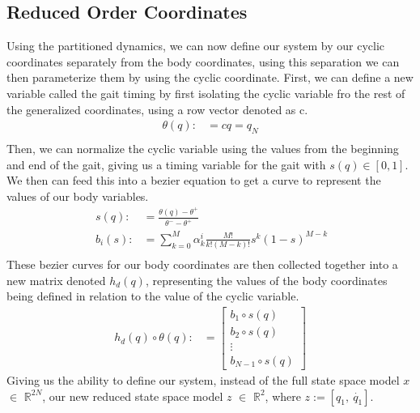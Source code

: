 \documentclass[letterpaper, 10 pt, conference]{ieeeconf}  %
\begin{document}
\subsection{Reduced Order Coordinates}
Using the partitioned dynamics, we can now define our system by our cyclic coordinates separately from the body coordinates, using this separation we can then parameterize them by using the cyclic coordinate. First, we can define a new variable called the gait timing by first isolating the cyclic variable fro the rest of the generalized coordinates, using a row vector denoted as c. 
\begin{equation}
\begin{aligned}
    \theta(q) :&= cq = q_N \\
\end{aligned}
\end{equation}
Then, we can normalize the cyclic variable using the values from the beginning and end of the gait, giving us a timing variable for the gait with $s(q) \in [0,1]$. We then can feed this into a bezier equation to get a curve to represent the values of our body variables.
\begin{equation}
\begin{aligned}
    \ s(q) :&= \frac{\theta(q) - \theta^{+}}{\theta^{-} - \theta^{+}} \\
    \ b_i(s) :&= \sum^{M}_{k=0} \alpha^{i}_{k} \frac{M!}{k!(M-k)!} s^{k} (1-s)^{M-k} \\
\end{aligned}
\end{equation}
These bezier curves for our body coordinates are then collected together into a new matrix denoted $h_d(q)$, representing the values of the body coordinates being defined in relation to the value of the cyclic variable. 
\begin{equation}
\begin{aligned}
    h_d(q) \circ \theta(q) :&=
    \begin{bmatrix}
    b_1\circ s(q)\\
    b_2\circ s(q)\\
    \vdots \\
    b_{N-1}\circ s(q)
\end{bmatrix}
\end{aligned}
\end{equation}
Giving us the ability to define our system, instead of the full state space model $x$ $\in$ $\mathbb{R}^{2N}$, our new reduced state space model $z$ $\in$ $\mathbb{R}^2$, where $z:= [q_1,~ \dot{q_1}]$.
\end{document}
